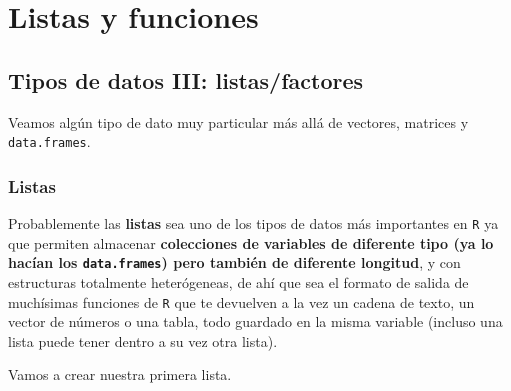 \documentclass[11pt,]{book}
\begin{document}
\hypertarget{part-listas-y-funciones}{%
\part{Listas y funciones}\label{part-listas-y-funciones}}

\hypertarget{otros_datos}{%
\chapter{Tipos de datos III: listas/factores}\label{otros_datos}}

Veamos algún tipo de dato muy particular más allá de vectores, matrices y \texttt{data.frames}.

\hypertarget{listas}{%
\section{Listas}\label{listas}}

Probablemente las \textbf{listas} sea uno de los tipos de datos más importantes en \texttt{R} ya que permiten almacenar \textbf{colecciones de variables de diferente tipo (ya lo hacían los \texttt{data.frames}) pero también de diferente longitud}, y con estructuras totalmente heterógeneas, de ahí que sea el formato de salida de muchísimas funciones de \texttt{R} que te devuelven a la vez un cadena de texto, un vector de números o una tabla, todo guardado en la misma variable (incluso una lista puede tener dentro a su vez otra lista).

Vamos a crear nuestra primera lista.
\end{document}
